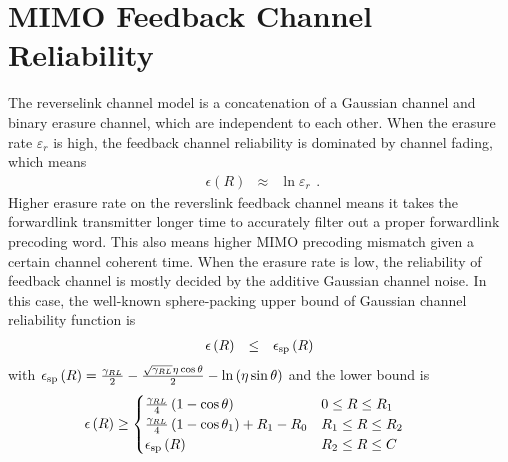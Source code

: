\documentclass[10pt,fleqn, twocolumn]{IEEEtran}
\begin{document}
\section{MIMO Feedback Channel Reliability}

The reverselink channel model is a concatenation of a Gaussian
channel and binary erasure channel, which are independent to each
other. When the erasure rate $\varepsilon_{r}$ is high, the
feedback channel reliability is dominated by channel fading, which
means
\begin{equation}%
\begin{array}{rcl}
\epsilon\left(R\right)&\approx&\ln\varepsilon_{r}
\end{array}.
\end{equation}
Higher erasure rate on the reverslink feedback channel means it
takes the forwardlink transmitter longer time to accurately filter
out a proper forwardlink precoding word. This also means higher
MIMO precoding mismatch given a certain channel coherent time.
When the erasure rate is low, the reliability of feedback channel
is mostly decided by the additive Gaussian channel noise. In this
case, the well-known sphere-packing upper bound of Gaussian
channel reliability function is
\begin{equation}%
\begin{array}{rcl}
\epsilon\left(R\right)&\leq&\epsilon_{\rm sp}\left(R\right)
\end{array}\label{reliability_upper_bound}
\end{equation}
\noindent with $\epsilon_{\rm
sp}\left(R\right)=\frac{\gamma_{\mbox{\tiny
RL}}}{2}-\frac{\sqrt{\gamma_{\mbox{\tiny
RL}}}\eta\cos\theta}{2}-\ln\left(\eta\sin\theta\right)$ and the
lower bound is
\begin{equation}\hspace{-0.30in}
\begin{array}{l}
\epsilon\left(R\right)\geq\begin{cases} \frac{\gamma_{\mbox{\tiny
RL}}}{4}\left(1-\cos\theta\right) &
0\leq R\leq R_{1} \\
\frac{\gamma_{\mbox{\tiny RL}}}{4}\left(1-\cos\theta_{1}\right)
+R_{1}-R_{0}&
R_{1}\leq R\leq R_{2} \\
\epsilon_{\rm sp}\left(R\right) &R_{2}\leq R\leq C
\end{cases}
\end{array}\label{reliability_lower_bound}
\end{equation}
\end{document}
